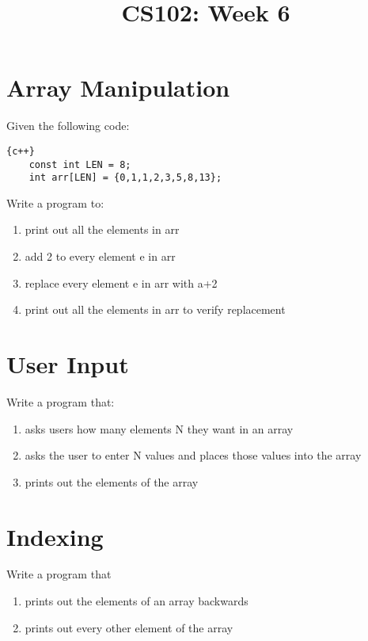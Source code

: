 \documentclass{article}
\begin{document}
\title{CS102: Week 6}

\maketitle

\section*{Array Manipulation}
Given the following code:
\begin{lstlisting}{c++}
	const int LEN = 8;
	int arr[LEN] = {0,1,1,2,3,5,8,13};
\end{lstlisting}
Write a program to:
\begin{enumerate}
	\item print out all the elements in arr
	\item add 2 to every element e in arr
	\item replace every element e in arr with a+2
	\item print out all the elements in arr to verify replacement
\end{enumerate}

\section*{User Input}
Write a program that:
\begin{enumerate}
	\item asks users how many elements N they want in an array
	\item asks the user to enter N values and places those values into the array
	\item prints out the elements of the array
\end{enumerate}

\section*{Indexing}
Write a program that
\begin{enumerate}
	\item prints out the elements of an array backwards
	\item prints out every other element of the array
\end{enumerate}
\pagebreak
\end{document}
